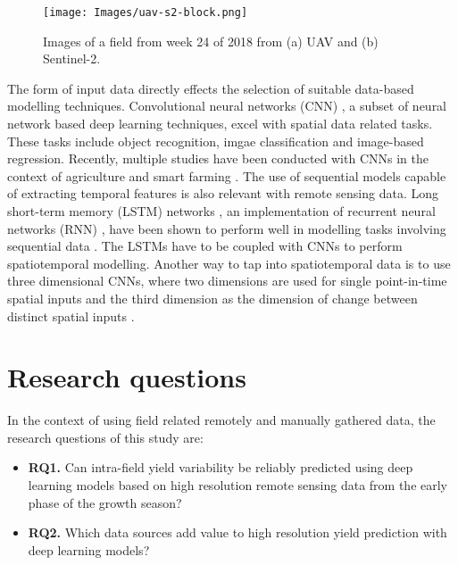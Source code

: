 \begin{figure}[htb]
    \centering
    \texttt{[image: Images/uav-s2-block.png]}
    \caption{Images of a field from week 24 of 2018 from (a) UAV and (b) Sentinel-2.}
    \label{fig:uav-s2-block}
\end{figure}

The form of input data directly effects the selection of suitable data-based modelling techniques. Convolutional neural networks (CNN) \cite{LeCun1989,LeCun1998b}, a subset of neural network based deep learning techniques, excel with spatial data related tasks. These tasks include object recognition, imgae classification and image-based regression. Recently, multiple studies have been conducted with CNNs in the context of agriculture and smart farming \cite{Kamilaris2018b}. The use of sequential models capable of extracting temporal features is also relevant with remote sensing data. Long short-term memory (LSTM) networks \cite{Hochreiter1997,Gers2000}, an implementation of recurrent neural networks (RNN) \cite{RumelhartDavidE1986Lrbb}, have been shown to perform well in modelling tasks involving sequential data \cite{Jozefowicz2015}. The LSTMs have to be coupled with CNNs to perform spatiotemporal modelling. Another way to tap into spatiotemporal data is to use three dimensional CNNs, where two dimensions are used for single point-in-time spatial inputs and the third dimension as the dimension of change between distinct spatial inputs \cite{Tran2015}. 

\section{Research questions}

In the context of using field related remotely and manually gathered data, the research questions of this study are:


\begin{itemize}
    \item[] \textbf{RQ1.} Can intra-field yield variability be reliably predicted using deep learning models based on high resolution remote sensing data from the early phase of the growth season?
    \item[] \textbf{RQ2.} Which data sources add value to high resolution yield prediction with deep learning models?
\end{itemize}

